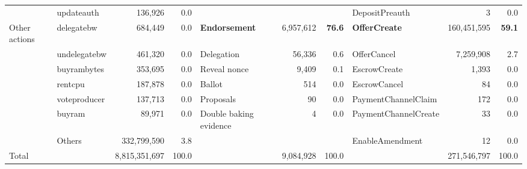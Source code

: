 \begin{table}[htbp]
\begin{tabular}{@{}lp{0.7in}rrp{1.2in}rrp{0.9in}rr@{}}
		                 & updateauth                         & 136,926                            & 0.0                                 &                        &           &                    & DepositPreauth       & 3           & 0.0                \\
		\cmidrule(r){1-1} \cmidrule(rl){2-4} \cmidrule(rl){5-7} \cmidrule(l){8-10}
		Other actions    & delegatebw                         & 684,449                            & 0.0                                 & \textbf{Endorsement}   & 6,957,612 & \textbf{     76.6} & \textbf{OfferCreate} & 160,451,595 & \textbf{     59.1} \\
		                 & undelegatebw                       & 461,320                            & 0.0                                 & Delegation             & 56,336    & 0.6                & OfferCancel          & 7,259,908   & 2.7                \\
		                 & buyrambytes                        & 353,695                            & 0.0                                 & Reveal nonce           & 9,409     & 0.1                & EscrowCreate         & 1,393       & 0.0                \\
		                 & rentcpu                            & 187,878                            & 0.0                                 & Ballot                 & 514       & 0.0                & EscrowCancel         & 84          & 0.0                \\
		                 & voteproducer                       & 137,713                            & 0.0                                 & Proposals              & 90        & 0.0                & PaymentChannelClaim  & 172         & 0.0                \\
		                 & buyram                             & 89,971                             & 0.0                                 & Double baking evidence & 4         & 0.0                & PaymentChannelCreate & 33          & 0.0                \\
		                 & Others                             & 332,799,590                        & 3.8                                 &                        &           &                    & EnableAmendment      & 12          & 0.0                \\
		\midrule
		\midrule
		Total            &                                    & 8,815,351,697                      & 100.0                               &                        & 9,084,928 & 100.0              &                      & 271,546,797 & 100.0              \\
		\bottomrule
	\end{tabular}%
\end{table}
